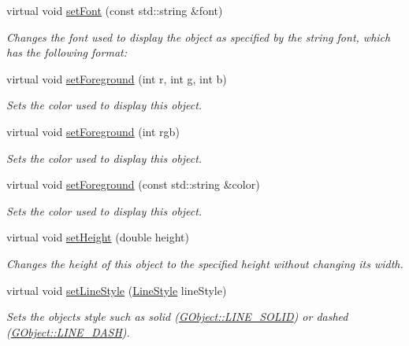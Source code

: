 \begin{DoxyCompactItemize}
virtual void \mbox{\hyperlink{classGObject_a8e096e8818d838aceae1d46d58fb3a7b}{set\+Font}} (const std\+::string \&font)
\begin{DoxyCompactList}\small\item\em Changes the font used to display the object as specified by the string {\ttfamily font}, which has the following format\+: \end{DoxyCompactList}\item 
virtual void \mbox{\hyperlink{classGObject_ad18e8fab1e02a4e9b75c6730212558eb}{set\+Foreground}} (int r, int g, int b)
\begin{DoxyCompactList}\small\item\em Sets the color used to display this object. \end{DoxyCompactList}\item 
virtual void \mbox{\hyperlink{classGObject_a9eb856b5ff83a19df3831a31f15f4563}{set\+Foreground}} (int rgb)
\begin{DoxyCompactList}\small\item\em Sets the color used to display this object. \end{DoxyCompactList}\item 
virtual void \mbox{\hyperlink{classGObject_af59209aeadea6dfc6d97a2d8531f50e1}{set\+Foreground}} (const std\+::string \&color)
\begin{DoxyCompactList}\small\item\em Sets the color used to display this object. \end{DoxyCompactList}\item 
virtual void \mbox{\hyperlink{classGObject_a9e280bfc4544dfaf8e4376c4e1a74357}{set\+Height}} (double height)
\begin{DoxyCompactList}\small\item\em Changes the height of this object to the specified height without changing its width. \end{DoxyCompactList}\item 
virtual void \mbox{\hyperlink{classGObject_add11575087eb94f1a71faa3f826c6341}{set\+Line\+Style}} (\mbox{\hyperlink{classGObject_a86e0f5648542856159bb40775c854aa7}{Line\+Style}} line\+Style)
\begin{DoxyCompactList}\small\item\em Sets the object\textquotesingle{}s style such as solid (\mbox{\hyperlink{classGObject_a86e0f5648542856159bb40775c854aa7a700c78bc2cd76acaab26651bf7b4941f}{G\+Object\+::\+L\+I\+N\+E\+\_\+\+S\+O\+L\+ID}}) or dashed (\mbox{\hyperlink{classGObject_a86e0f5648542856159bb40775c854aa7a9ccba0845f785d81d07b333ae1aad84e}{G\+Object\+::\+L\+I\+N\+E\+\_\+\+D\+A\+SH}}). \end{DoxyCompactList}\item 

\end{DoxyCompactItemize}
